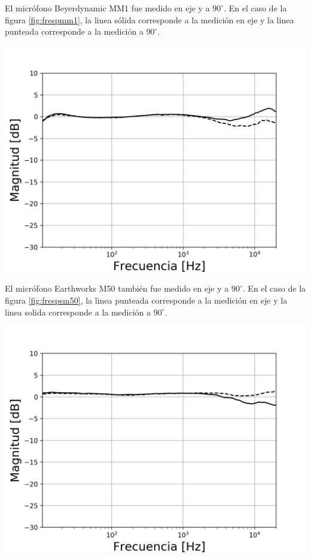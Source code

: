 \documentclass[]{article}
\makeatletter
\newenvironment{figurehere}   %
  {\def\@captype{figure}}   %
  {\par\medskip}
  {}              %
\makeatother
\begin{document}
\begin{multicols}{2}
El micrófono Beyerdynamic MM1 fue medido en eje y a $90^\circ$. En el caso de
la figura \ref{fig:frespmm1}, la linea sólida corresponde a la medición en eje y
la linea punteada corresponde a la medición a $90^\circ$.

\begin{figurehere}
 \centering
 \includegraphics[width=\linewidth]{BEYERDYNAMIC MM1}
 \label{fig:frespmm1}
\end{figurehere}

El micrófono Earthworks M50 también fue medido en eje y a $90^\circ$. En el caso de
la figura \ref{fig:frespsm50}, la linea punteada corresponde a la medición en eje y
la linea solida corresponde a la medición a $90^\circ$.

\begin{figurehere}
 \centering
 \includegraphics[width=\linewidth]{EARTHWORKS M50x2}
 \label{fig:frespsm50}
\end{figurehere}


\end{multicols}
\end{document}
